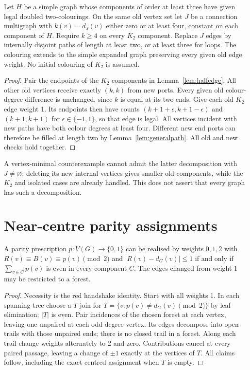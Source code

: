 \begin{theorem}[A5]\label{thm:simultaneous}
Let $H$ be a simple graph whose components of order at least three
have given legal doubled two-colourings. On the same old vertex set
let $J$ be a connection multigraph with $k(v)=d_J(v)$ either zero
or at least four, constant on each component of $H$. Require $k\ge4$
on every $K_2$ component. Replace $J$ edges by internally disjoint
paths of length at least two, or at least three for loops. The
colouring extends to the simple expanded graph preserving every
given old edge weight. No initial colouring of $K_2$ is assumed.
\end{theorem}
\begin{proof}
Pair the endpoints of the $K_2$ components in
Lemma~\ref{lem:halfedge}. All other old vertices receive exactly
$(k,k)$ from new ports. Every given old colour-degree difference is
unchanged, since $k$ is equal at its two ends. Give each old $K_2$
edge weight 1. Its endpoints then have counts
$(k+1+\epsilon,k+1-\epsilon)$ and $(k+1,k+1)$ for
$\epsilon\in\{-1,1\}$, so that edge is legal. All vertices incident
with new paths have both colour degrees at least four. Different
new end ports can therefore be filled at length two by
Lemma~\ref{lem:generalpath}. All old and new checks hold together.
\end{proof}

A vertex-minimal counterexample cannot admit the latter decomposition
with $J\ne\varnothing$: deleting its new internal vertices gives
smaller old components, while the $K_2$ and isolated cases are already
handled. This does not assert that every graph has such a decomposition.

\section{Near-centre parity assignments}\label{sec:parity}

\begin{lemma}\label{lem:nearparity}
A parity prescription $p:V(G)\to\{0,1\}$ can be realised by weights
$0,1,2$ with $R(v)\equiv B(v)\equiv p(v)\pmod2$ and
$|R(v)-d_G(v)|\le1$ if and only if $\sum_{v\in C}p(v)$ is even
in every component $C$. The edges changed from weight 1 may be
restricted to a forest.
\end{lemma}
\begin{proof}
Necessity is the red handshake identity. Start with all weights 1.
In each spanning tree choose a $T$-join for
$T=\{v:p(v)\ne d_G(v)\pmod2\}$ by leaf elimination; $|T|$ is even.
Pair incidences of the chosen forest at each vertex, leaving one
unpaired at each odd-degree vertex. Its edges decompose into open
trails with those unpaired ends; there is no closed trail in a forest.
Along each trail change weights alternately to 2 and zero. Contributions
cancel at every paired passage, leaving a change of $\pm1$ exactly
at the vertices of $T$. All claims follow, including the exact centred
assignment when $T$ is empty.
\end{proof}


